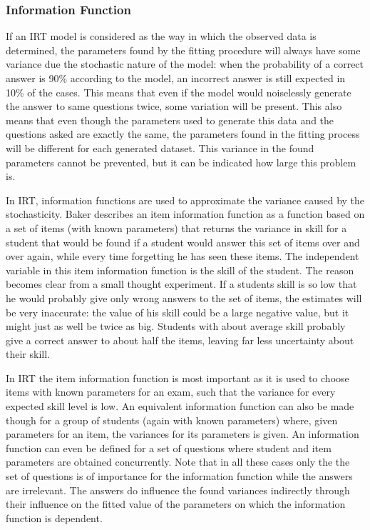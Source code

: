 \documentclass{scrartcl}
\begin{document}
\subsubsection{Information Function}
\label{sec:inherent}
If an IRT model is considered as the way in which the observed data is determined, the parameters found by the fitting procedure will always have some variance due the stochastic nature of the model: when the probability of a correct answer is 90\% according to the model, an incorrect answer is still expected in 10\% of the cases. This means that even if the model would noiselessly generate the answer to same questions twice, some variation will be present. This also means that even though the parameters used to generate this data and the questions asked are exactly the same, the parameters found in the fitting process will be different for each generated dataset. This variance in the found parameters cannot be prevented, but it can be indicated how large this problem is.  

In IRT, information functions are used to approximate the variance caused by the stochasticity. Baker \cite{basicbaker} describes an item information function as a function based on a set of items (with known parameters) that returns the variance in skill for a student that would be found if a student would answer this set of items over and over again, while every time forgetting he has seen these items. The independent variable in this item information function is the skill of the student. The reason becomes clear from a small thought experiment. If a students skill is so low that he would probably give only wrong answers to the set of items, the estimates will be very inaccurate: the value of his skill could be a large negative value, but it might just as well be twice as big. Students with about average skill probably give a correct answer to about half the items, leaving far less uncertainty about their skill.

In IRT the item information function is most important as it is used to choose items with known parameters for an exam, such that the variance for every expected skill level is low. An equivalent information function can also be made though for a group of students (again with known parameters) where, given parameters for an item, the variances for its parameters is given. An information function can even be defined for a set of questions where student and item parameters are obtained concurrently. Note that in all these cases only the the set of questions is of importance for the information function while the answers are irrelevant. The answers do influence the found variances indirectly through their influence on the fitted value of the parameters on which the information function is dependent.
\end{document}
